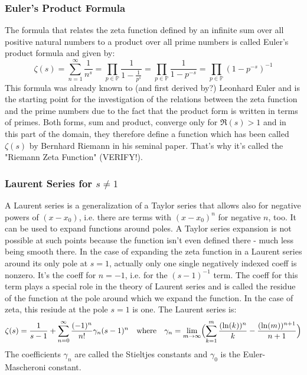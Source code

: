 \documentclass[12pt]{article}
\begin{document}
\subsubsection{Euler's Product Formula}
The formula that relates the zeta function defined by an infinite sum over all positive natural numbers to a product over all prime numbers is called Euler's product formula and given by:
\begin{equation}
\label{Eq:EulerProduct}		
\zeta(s)		
= \sum_{n=1}^{\infty} \frac{1}{n^s}
= \prod_{p \in \mathbb{P}} \frac{1}{1 - \frac{1}{p^s} }
= \prod_{p \in \mathbb{P}} \frac{1}{1 - p^{-s} }    
= \prod_{p \in \mathbb{P}} (1 - p^{-s})^{-1}
\end{equation}
This formula was already known to (and first derived by?) Leonhard Euler and is the starting point for the investigation of the relations between the zeta function and the prime numbers due to the fact that the product form is written in terms of primes. Both forms, sum and product, converge only for $\Re(s) > 1$ and in this part of the domain, they therefore define a function which has been called $\zeta(s)$ by Bernhard Riemann in his seminal paper. That's why it's called the "Riemann Zeta Function" (VERIFY!).

\subsubsection{Laurent Series for $s \neq 1$}
A Laurent series is a generalization of a Taylor series that allows also for negative powers of $(x-x_0)$, i.e. there are terms with $(x-x_0)^n$ for negative $n$, too. It can be used to expand functions around poles. A Taylor series expansion is not possible at such points because the function isn't even defined there - much less being smooth there. In the case of expanding the zeta function in a Laurent series around its only pole at $s=1$, actually only one single negatively indexed coeff is nonzero. It's the coeff for $n=-1$, i.e. for the $(s-1)^{-1}$ term. The coeff for this term plays a special role in the theory of Laurent series and is called the residue of the function at the pole around which we expand the function. In the case of zeta, this resiude at the pole $s=1$ is one. The Laurent series is:
\begin{equation}
\label{Eq:LaurentSeries}	
\zeta(s) = \frac{1}{s-1} + \sum_{n=0}^{\infty} \frac{(-1)^n}{n!} \gamma_n (s-1)^n
\quad \text{where} \quad
\gamma_n = \lim_{m \rightarrow \infty}
\Bigl( \sum_{k=1}^{m} \frac{(\ln(k))^n}{k} - \frac{(\ln(m))^{n+1}}{n+1}  \Bigr)
\end{equation}
The coefficients $\gamma_n$ are called the Stieltjes constants and $\gamma_0$ is the Euler-Mascheroni constant. 
\end{document}
